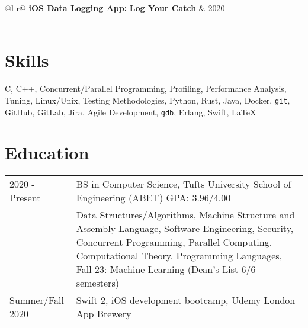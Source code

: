 \documentclass[letter,10pt]{article}
\begin{document}
\begin{tabularx}{\linewidth}{ @{}l r@{} }
    \textbf{iOS Data Logging App:} \href{https://github.com/bstrand42/Log-Your-Catch}{\textbf{Log Your Catch}} & \hfill 2020 \\[3.75pt]
     \\[3.75pt]
\end{tabularx}

\section{Skills}
\normalsize{C, C++, Concurrent/Parallel Programming, Profiling, Performance Analysis, Tuning, Linux/Unix, Testing Methodologies, Python, Rust, Java, Docker, \texttt{git}, GitHub, GitLab, Jira, Agile Development, \texttt{gdb}, Erlang, Swift, \LaTeX}

\section{Education}
\begin{tabularx}{\linewidth}{@{}l X@{}}	
2020 - Present & BS in Computer Science, Tufts University School of Engineering (ABET) \hfill \normalsize GPA: 3.96/4.00 \\
    & \footnotesize{Data Structures/Algorithms, Machine Structure and Assembly Language, Software Engineering, Security, Concurrent Programming, Parallel Computing, Computational Theory, Programming Languages, Fall 23: Machine Learning} (Dean's List 6/6 semesters) \\[3.75pt]
Summer/Fall 2020 & Swift 2, iOS development bootcamp, Udemy London App Brewery
\end{tabularx}



\end{document}
